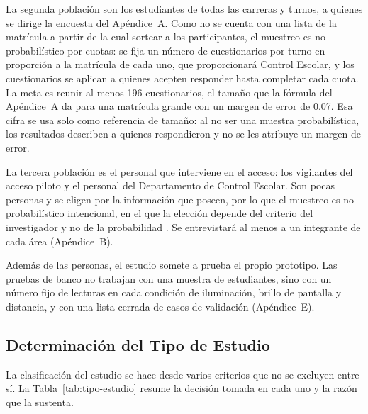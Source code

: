 La segunda población son los estudiantes de todas las carreras y turnos, a
quienes se dirige la encuesta del Apéndice~A. Como no se cuenta con una lista
de la matrícula a partir de la cual sortear a los participantes, el muestreo
es no probabilístico por cuotas: se fija un número de cuestionarios por turno
en proporción a la matrícula de cada uno, que proporcionará Control Escolar, y
los cuestionarios se aplican a quienes acepten responder hasta completar cada
cuota. La meta es reunir al menos 196 cuestionarios, el tamaño que la fórmula
del Apéndice~A da para una matrícula grande con un margen de error de 0.07.
Esa cifra se usa solo como referencia de tamaño: al no ser una muestra
probabilística, los resultados describen a quienes respondieron y no se les
atribuye un margen de error.

La tercera población es el personal que interviene en el acceso: los
vigilantes del acceso piloto y el personal del Departamento de Control
Escolar. Son pocas personas y se eligen por la información que poseen, por lo
que el muestreo es no probabilístico intencional, en el que la elección
depende del criterio del investigador y no de la probabilidad
\parencite{hernandezsampieri2014metodologia}. Se entrevistará al menos a
un integrante de cada área (Apéndice~B).

Además de las personas, el estudio somete a prueba el propio prototipo. Las
pruebas de banco no trabajan con una muestra de estudiantes, sino con un
número fijo de lecturas en cada condición de iluminación, brillo de pantalla
y distancia, y con una lista cerrada de casos de validación (Apéndice~E).

\subsection{Determinación del Tipo de Estudio}
La clasificación del estudio se hace desde varios criterios que no se
excluyen entre sí. La Tabla~\ref{tab:tipo-estudio} resume la decisión
tomada en cada uno y la razón que la sustenta.

